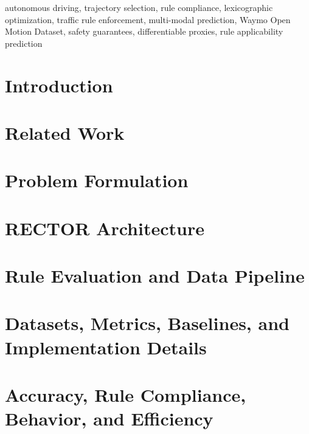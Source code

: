 \documentclass[lettersize,journal, twocolumn]{IEEEtran}
\begin{document}
\begin{IEEEkeywords}
autonomous driving, trajectory selection, rule compliance,
lexicographic optimization, traffic rule enforcement,
multi-modal prediction, Waymo Open Motion Dataset, safety guarantees,
differentiable proxies, rule applicability prediction
\end{IEEEkeywords}


\section{Introduction}
\label{Sec:Introduction}


\section{Related Work}
\label{Sec:Related_Works}


\section{Problem Formulation}
\label{Sec:Problem_Formulation}



\section{RECTOR Architecture}
\label{Sec:RECTOR}



\section{Rule Evaluation and Data Pipeline}
\label{Sec:Rule_Evaluation_And_Data_Pipeline}


\section{Datasets, Metrics, Baselines, and Implementation Details}
\label{Sec:Experiments}



\section{Accuracy, Rule Compliance, Behavior, and Efficiency}
\label{Sec:Accuracy_SectionRule-Compliance_Behavior_and_Efficiency}

\end{document}
